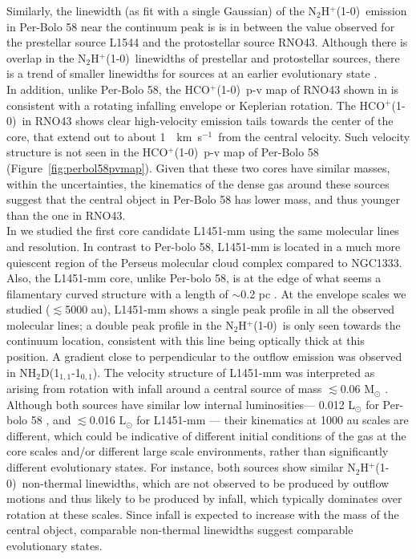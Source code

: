 \documentclass[iop]{emulateapj}
\newcommand{\kms}{\,~km~s$^{-1}$}
\newcommand{\nhtd}{\mbox{\rm NH$_2$D(1$_{1,1}$-1$_{0,1}$)}}
\newcommand{\nthp}{\mbox{\rm N$_2$H$^+$(1-0)}}
\newcommand{\hcop}{\mbox{\rm  HCO$^+$(1-0)}}
\begin{document}
Similarly, the linewidth (as fit with a single Gaussian) of the \nthp\ emission in Per-Bolo 58 near the continuum peak is is in between the value observed for the prestellar source L1544 and the protostellar source RNO43. Although there is overlap in the \nthp\ linewidths of prestellar and protostellar sources, there is a trend of smaller linewidths for sources at an earlier evolutionary state \citep{2015HsiehProperties}.\\

In addition, unlike Per-Bolo 58, the \hcop\ p-v map of RNO43 shown in \cite{2011TobinComplex} is consistent with a rotating infalling envelope or Keplerian rotation. The \hcop\ in RNO43 shows clear high-velocity emission tails towards the center of the core, that extend out to about 1 \kms\ from the central velocity. Such velocity structure is not seen in the \hcop\ p-v map of Per-Bolo 58 (Figure~\ref{fig:perbol58pvmap}). Given that these two cores have similar masses, within the uncertainties, the kinematics of the dense gas around these sources suggest that the central object in Per-Bolo 58 has lower mass, and thus younger than the one in RNO43.\\

In \cite{2017MaureiraKinematics} we studied the first core candidate L1451-mm using the same molecular lines and resolution. In contrast to Per-bolo 58, L1451-mm is located in a much more quiescent region of the Perseus molecular cloud complex compared to NGC1333. Also, the L1451-mm core, unlike Per-bolo 58, is at the edge of what seems a filamentary curved structure with a length of $\sim$0.2 pc \citep{2016StormCARMA}. At the envelope scales we studied ($\lesssim$5000 au), L1451-mm shows a single peak profile in all the observed molecular lines; a double peak profile in the \nthp\ is only seen towards the continuum location, consistent with this line being optically thick at this position. A gradient close to perpendicular to the outflow emission was observed in \nhtd. The velocity structure of L1451-mm was interpreted as arising from rotation with infall around a central source of mass $\lesssim$0.06 M$_{\odot}$ \citep{2017MaureiraKinematics}. Although both sources have similar low internal luminosities--- 0.012 L$_{\odot}$ for Per-bolo 58 \citep{2010EnochCandidate}, and $\lesssim$0.016 L$_{\odot}$ for L1451-mm \citep{2011PinedaEnigmatic}--- their kinematics at 1000 au scales are different, which could be indicative of different initial conditions of the gas at the core scales and/or different large scale environments, rather than significantly different evolutionary states. For instance, both sources show similar \nthp\ non-thermal linewidths, which are not observed to be produced by outflow motions and thus likely to be produced by infall, which typically dominates over rotation at these scales. Since infall is expected to increase with the mass of the central object, comparable non-thermal linewidths suggest comparable evolutionary states.
\end{document}
